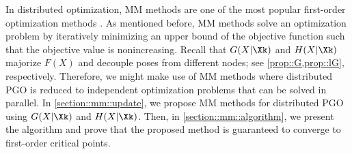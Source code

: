 {\highlight In distributed optimization, MM methods are one of the most popular first-order optimization methods  \cite{hunter2004tutorial,sun2016majorization}. As mentioned before, MM methods solve an optimization problem by iteratively minimizing an upper bound of the objective function such that the objective value is nonincreasing. Recall that $G(X|\Xk)$ and $H(X|\Xk)$ majorize $F(X)$ and decouple poses from different nodes; see \cref{prop::G,prop::lG}, respectively. Therefore, we might make use of MM methods where distributed PGO is reduced to independent optimization problems that can be solved in parallel.  In \cref{section::mm::update}, we propose MM methods for distributed PGO using $G(X|\Xk)$ and $H(X|\Xk)$. Then, in \cref{section::mm::algorithm}, we present the algorithm and prove that the proposed method is guaranteed to converge to first-order critical points.}

\vspace{-0.75em}

